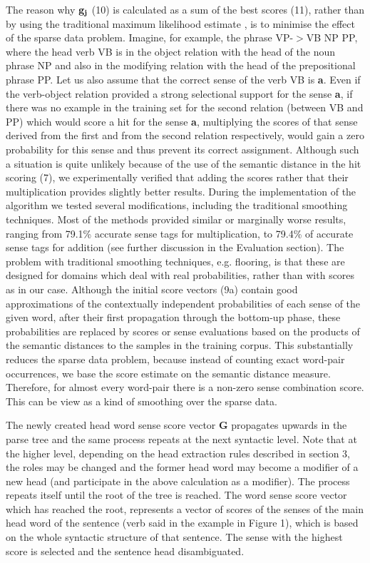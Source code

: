 The reason why ${\bf g_{j}}$ (10) is calculated as a sum of the best scores (11), rather than by using the traditional maximum likelihood estimate \cite{Berger96}\cite{Gale93}, is to minimise the effect of the sparse data problem. Imagine, for example, the phrase VP-$>$VB NP PP, where the head verb VB is in the object relation with the head of the noun phrase NP and also in the modifying relation with the head of the prepositional phrase PP. Let us also assume that the correct sense of the verb VB is {\bf a}. Even if the verb-object relation provided a strong selectional support for the sense {\bf a}, if there was no example in the training set for the second relation (between VB and PP) which would score a hit for the sense {\bf a}, multiplying the scores of that sense derived from the first and from the second relation respectively, would gain a zero probability for this sense and thus prevent its correct assignment. Although such a situation is quite unlikely because of the use of the semantic distance in the hit scoring (7), we experimentally verified that adding the scores rather that their multiplication provides slightly better results. During the implementation of the algorithm we tested several modifications, including the traditional smoothing techniques. 
Most of the methods provided similar
or marginally worse results, ranging from 79.1\% accurate sense tags for
multiplication, to 79.4\% of accurate sense tags for addition (see
further discussion in the Evaluation section).
The problem with traditional smoothing techniques, e.g. flooring, is that these are designed for domains which deal with real probabilities, rather than with scores as in our case. Although the initial score vectors (9a) contain good approximations of the contextually independent probabilities of each sense of the given word, after their first propagation through the bottom-up phase, these probabilities are replaced by scores or sense evaluations based on the products of the semantic distances to the samples in the training corpus. This substantially reduces the sparse data problem, because instead of counting exact word-pair occurrences, we base the score estimate on the semantic distance measure. Therefore, for almost every word-pair there is a non-zero sense combination score. This can be view as a kind of smoothing over the sparse data. 

The newly created head word sense score vector {\bf G} propagates upwards in the parse tree and the same process repeats at the next syntactic level. Note that at the higher level, depending on the head extraction rules described in section 3, the roles may be changed and the former head word may become a modifier of a new head (and participate in the above calculation as a modifier). The process repeats itself until the root of the tree is reached. The word sense score vector which has reached the root, represents a vector of scores of the senses of the main head word of the sentence (verb said in the example in Figure 1), which is based on the whole syntactic structure of that sentence. The sense with the highest score is selected and the sentence head disambiguated.

